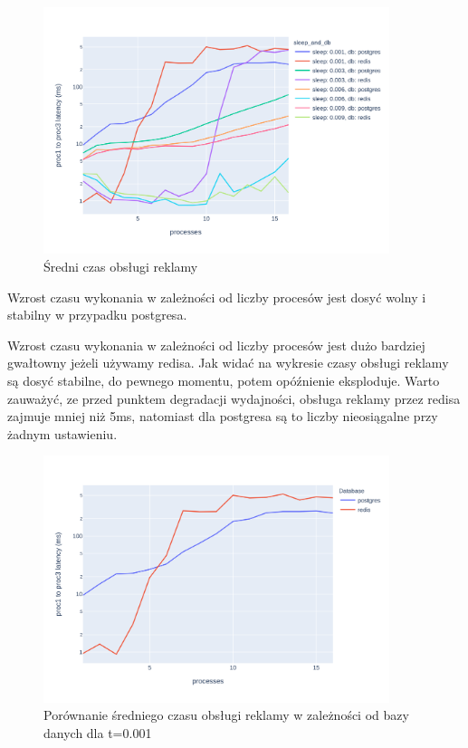 \documentclass[10pt]{article}
\begin{document}
\begin{figure}[H]
    \centering
    \includegraphics[width=0.9\textwidth]{./graphs/diff_in_end_all_sleeps.png}
    \caption{Średni czas obsługi reklamy}
\end{figure}

Wzrost czasu wykonania w zależności od liczby procesów jest dosyć wolny i stabilny w przypadku postgresa.

Wzrost czasu wykonania w zależności od liczby procesów jest dużo bardziej gwałtowny jeżeli używamy redisa. Jak widać na wykresie czasy obsługi reklamy są dosyć stabilne, do pewnego momentu, potem opóźnienie eksploduje. Warto zauważyć, ze przed punktem degradacji wydajności, obsługa reklamy przez redisa zajmuje mniej niż 5ms, natomiast dla postgresa są to liczby nieosiągalne przy żadnym ustawieniu.

\begin{figure}[H]
    \centering
    \includegraphics[width=0.9\textwidth]{./graphs/diff_in_end_postgres_vs_redis0001.png}
    \caption{Porównanie średniego czasu obsługi reklamy w zależności od bazy danych dla t=0.001}
\end{figure}
\end{document}

